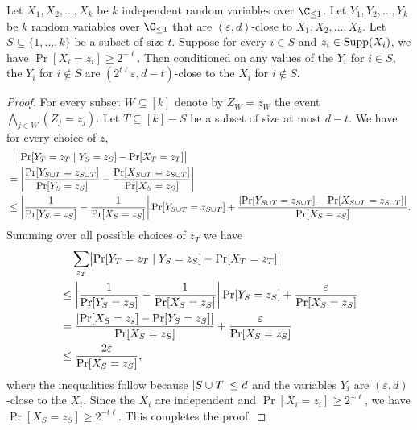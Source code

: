 \documentclass{toc}
\def\eps{\varepsilon}
\def\Blocklength{\ell}
\def\cond{\mid}
\def\Supp{\textnormal{Supp}}
\DeclarePairedDelimiter{\abs}{\lvert}{\rvert}
\begin{document}
  \begin{claim} \label{claim-conditional}
    Let $X_1, X_2, \ldots, X_k$ be $k$ independent random variables over $\C_{\le 1}$.
    Let $Y_1, Y_2, \ldots, Y_k$ be $k$ random variables over $\C_{\le 1}$ that are $(\eps, d)$-close to $X_1, X_2, \ldots, X_k$.
    Let $S \subseteq \{1, \ldots, k\}$ be a subset of size $t$.
    Suppose for every $i \in S$ and $z_i \in \Supp(X_i)$, we have $\Pr[X_i = z_i] \ge 2^{-\Blocklength}$.
    Then conditioned on any values of the $Y_i$ for $i \in S$, the $Y_i$ for $i \not\in S$ are $(2^{t\Blocklength} \eps, d - t)$-close to the $X_i$ for $i \not\in S$.
  \end{claim}
  \begin{proof}
    For every subset $W \subseteq [k]$ denote by $Z_W = z_W$ the event $\bigwedge_{j \in W} (Z_j = z_j)$.
    Let $T \subseteq [k] - S$ be a subset of size at most $d - t$.
    We have for every choice of $z$,
    \begin{align*}
      &\quad \bigl| \Pr[Y_T = z_T \cond Y_S = z_S] - \Pr[X_T = z_T] \bigr| \\
      &= \left| \frac{\Pr[Y_{S \cup T} = z_{S \cup T}]}{\Pr[Y_S = z_S]} - \frac{\Pr[X_{S \cup T} = z_{S \cup T}]}{\Pr[X_S = z_S]} \right| \\
      &\le \left| \frac{1}{\Pr[Y_S = z_S]} - \frac{1}{\Pr[X_S = z_S]} \right| \Pr[Y_{S \cup T} = z_{S \cup T}] + \frac{\abs{\Pr[Y_{S \cup T} = z_{S \cup T}] - \Pr[X_{S \cup T} = z_{S \cup T}]}}{\Pr[X_S = z_S]}  .
    \end{align*}
    Summing over all possible choices of $z_T$ we have
    \begin{align*}
      &\quad \sum_{z_T} \bigl| \Pr[Y_T = z_T \cond Y_S = z_S] - \Pr[X_T = z_T] \bigr| \\
      &\le \left| \frac{1}{\Pr[Y_S = z_S]} - \frac{1}{\Pr[X_S = z_S]} \right| \Pr[Y_S = z_S] + \frac{\eps}{\Pr[X_S = z_S]} \\
      &= \frac{\abs{\Pr[X_S = z_s] - \Pr[Y_S = z_S]}}{\Pr[X_S = z_S]} + \frac{\eps}{\Pr[X_S = z_S]} \\
      &\le \frac{2 \eps}{\Pr[X_S = z_S]} ,
    \end{align*}
    where the inequalities follow because $\abs{S \cup T} \le d$ and the variables $Y_i$ are $(\eps, d)$-close to the $X_i$.
    Since the $X_i$ are independent and $\Pr[X_i = z_i] \ge 2^{-\Blocklength}$, we have $\Pr[X_S = z_S] \ge 2^{-t \Blocklength}$.
    This completes the proof.
  \end{proof}
  
\end{document}
